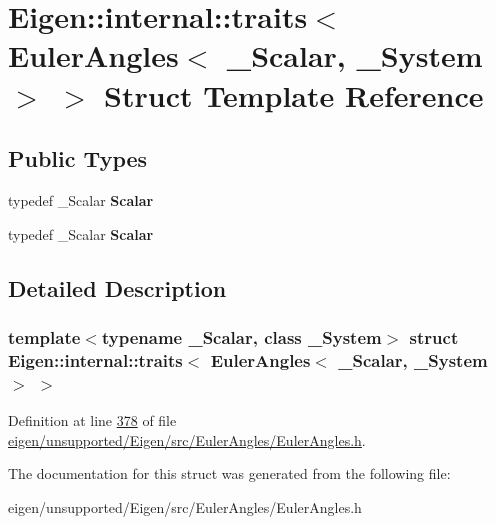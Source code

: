\hypertarget{struct_eigen_1_1internal_1_1traits_3_01_euler_angles_3_01___scalar_00_01___system_01_4_01_4}{}\section{Eigen\+:\+:internal\+:\+:traits$<$ Euler\+Angles$<$ \+\_\+\+Scalar, \+\_\+\+System $>$ $>$ Struct Template Reference}
\label{struct_eigen_1_1internal_1_1traits_3_01_euler_angles_3_01___scalar_00_01___system_01_4_01_4}
\subsection*{Public Types}
\begin{DoxyCompactItemize}
\item 
\mbox{\label{struct_eigen_1_1internal_1_1traits_3_01_euler_angles_3_01___scalar_00_01___system_01_4_01_4_ab2a2f8ac37ebe3ab6fa815623123a093}} 
typedef \+\_\+\+Scalar {\bfseries Scalar}
\item 
\mbox{\label{struct_eigen_1_1internal_1_1traits_3_01_euler_angles_3_01___scalar_00_01___system_01_4_01_4_ab2a2f8ac37ebe3ab6fa815623123a093}} 
typedef \+\_\+\+Scalar {\bfseries Scalar}
\end{DoxyCompactItemize}


\subsection{Detailed Description}
\subsubsection*{template$<$typename \+\_\+\+Scalar, class \+\_\+\+System$>$\newline
struct Eigen\+::internal\+::traits$<$ Euler\+Angles$<$ \+\_\+\+Scalar, \+\_\+\+System $>$ $>$}



Definition at line \hyperlink{eigen_2unsupported_2_eigen_2src_2_euler_angles_2_euler_angles_8h_source_l00378}{378} of file \hyperlink{eigen_2unsupported_2_eigen_2src_2_euler_angles_2_euler_angles_8h_source}{eigen/unsupported/\+Eigen/src/\+Euler\+Angles/\+Euler\+Angles.\+h}.



The documentation for this struct was generated from the following file\+:\begin{DoxyCompactItemize}
\item 
eigen/unsupported/\+Eigen/src/\+Euler\+Angles/\+Euler\+Angles.\+h\end{DoxyCompactItemize}
